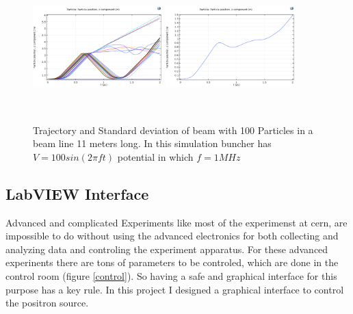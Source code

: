 \documentclass[12pt,a4paper]{article}
\begin{document}
\begin{figure}[h]
\centering
\includegraphics[width=50mm, height=50mm]{buncer-in-100V-1Mhz-50Particles}
\includegraphics[width=50mm, height=50mm]{buncer-std-100V-1Mhz-50Particles}
\caption{Trajectory and Standard deviation of beam with 100 Particles in a beam line 11 meters long. In this simulation buncher has $ V = 100 sin(2 \pi f t) $ potential in which $ f=1 MHz $}
\end{figure}



\newpage


\subsection{LabVIEW Interface}

Advanced and complicated Experiments like most of the experimenst at cern, are impossible to do without using the advanced electronics for both collecting and analyzing data and controling the experiment apparatus. For these advanced experinents there are tons of parameters to be controled, which are done in the control room (figure \ref{control}). 
So having a safe and graphical interface for this purpose has a key rule. In this project I designed a graphical interface to control the positron source. 
\end{document}

